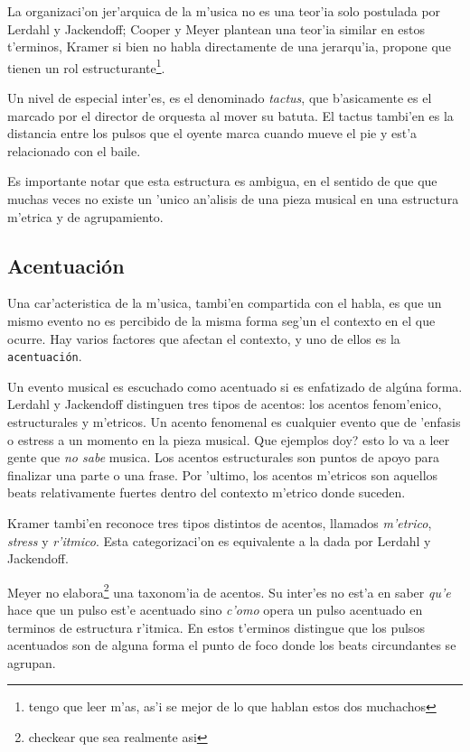 La organizaci'on jer'arquica de la m'usica no es una teor'ia solo postulada por Lerdahl y Jackendoff; Cooper y Meyer\cite{CooperMeyer60} plantean una teor'ia similar en
estos t'erminos, Kramer\cite{Kramer88} si bien no habla directamente de una jerarqu'ia, propone que tienen un rol 
estructurante\footnote{\alert{tengo que leer m'as, as'i se mejor de lo que hablan estos dos muchachos}}. 

Un nivel de especial inter'es, es el denominado \emph{tactus}, que b'asicamente es el marcado por el director de orquesta al mover su batuta. 
El tactus tambi'en es la distancia entre los pulsos que el oyente marca cuando mueve el pie y est'a relacionado con el baile. 

Es importante notar que esta estructura es ambigua, en el sentido de que que muchas veces no existe un 'unico an'alisis de una pieza musical 
en una estructura m'etrica y de agrupamiento.


\subsection{Acentuaci\'on}
Una car'acteristica de la m'usica, tambi'en compartida con el habla, es que un mismo evento no es percibido de la misma forma seg'un
el contexto en el que ocurre. Hay varios factores que afectan el contexto, y uno de ellos es la \texttt{acentuaci\'on}. 

Un evento musical es escuchado como acentuado si es enfatizado de alg\'una forma. Lerdahl y Jackendoff\cite{LerdahlJackendoff83} distinguen tres tipos de 
acentos: los acentos fenom'enico, estructurales y m'etricos.
Un acento fenomenal es cualquier evento que de 'enfasis o estress a un momento en la pieza musical. \alert{Que ejemplos doy? esto lo va a 
leer gente que \emph{no sabe} musica}. Los acentos estructurales son puntos de apoyo para finalizar una parte o una frase. 
Por 'ultimo, los acentos m'etricos son aquellos beats relativamente fuertes dentro del contexto m'etrico donde suceden.

Kramer\cite{Kramer88} tambi'en reconoce tres tipos distintos de acentos, llamados \emph{m'etrico}, \emph{stress} y \emph{r'itmico}. Esta categorizaci'on
es equivalente a la dada por Lerdahl y Jackendoff.

Meyer\cite{CooperMeyer60} no elabora\footnote{checkear que sea realmente asi} una taxonom'ia de acentos. Su inter'es no est'a en saber \emph{qu'e} hace
que un pulso est'e acentuado sino \emph{c'omo} opera un pulso acentuado en terminos de estructura r'itmica. En estos t'erminos distingue
que los pulsos acentuados son de alguna forma el punto de foco donde los beats circundantes se agrupan. 

